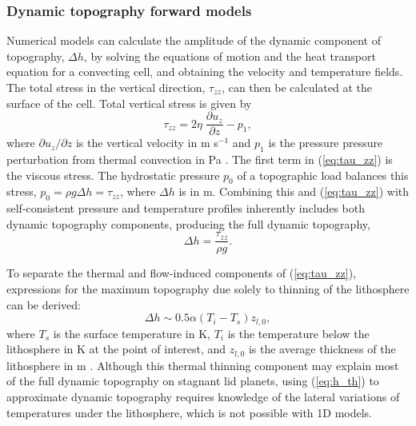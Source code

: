 \subsubsection{Dynamic topography forward models}\label{sec:dyn_top_forward}


Numerical models can calculate the amplitude of the dynamic component of topography, $\Delta h$, by solving the equations of motion and the heat transport equation for a convecting cell, and obtaining the velocity and temperature fields. The total stress in the vertical direction, $\tau_{zz}$, can then be calculated at the surface of the cell. Total vertical stress is given by 
\begin{equation}\label{eq:tau_zz}
\tau_{zz} = 2\eta \; \frac{\partial u_z}{\partial z} - p_1,
\end{equation}
where $\partial u_z / \partial z$ is the vertical velocity in m s$^{-1}$ and $p_1$ is the pressure pressure perturbation from thermal convection in Pa \citep{Parsons1983}. The first term in (\ref{eq:tau_zz}) is the viscous stress. The hydrostatic pressure $p_0$ of a topographic load balances this stress, $p_0 = \rho g \Delta h = \tau_{zz}$, where $\Delta h$ is in m. Combining this and (\ref{eq:tau_zz}) with self-consistent pressure and temperature profiles inherently includes both dynamic topography components, producing the full dynamic topography,
\begin{equation}\label{eq:h_stress}
\Delta h = \frac{\tau_{zz}}{\rho g}.
\end{equation} 

To separate the thermal and flow-induced components of (\ref{eq:tau_zz}), expressions for the maximum topography due solely to thinning of the lithosphere can be derived: 
\begin{equation}\label{eq:h_th}
\Delta h \sim 0.5\alpha (T_i - T_s) z_{l, 0},
\end{equation}
where $T_s$ is the surface temperature in K, $T_i$ is the temperature below the lithosphere in K at the point of interest, and $z_{l, 0}$ is the average thickness of the lithosphere in m \citep{Kucinskas1994, Orth2011}. Although this thermal thinning component may explain most of the full dynamic topography on stagnant lid planets, using (\ref{eq:h_th}) to approximate dynamic topography \citep[the ``isostatic stagnant lid approximation";][]{Orth2011} requires knowledge of the lateral variations of temperatures under the lithosphere, which is not possible with 1D models.



